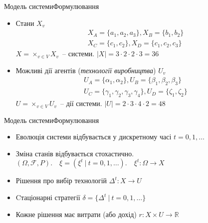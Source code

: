 \documentclass[pdf]{beamer}
\begin{document}
\begin{frame}{Модель системи}{Формулювання}
	\begin{itemize}[<+->]
	\item Стани \(X_v\)
	\begin{gather*}
		X_A = \{a_1, a_2, a_3\}, X_B = \{b_1, b_2\} \\ 
		X_C = \{c_1, c_2\}, X_D = \{c_1, c_2, c_3\}
	\end{gather*}
	\(X = \times_{v \in V} X_v\) – системи. \(|X| = 3 \cdot 2 \cdot 2 \cdot 3 = 36 \)
	\vspace{1em}
	\item Можливі дії агентів (\textit{технології виробництва}) \(U_v\)
	\begin{gather*}
		U_A = \{\alpha_1, \alpha_2\}, U_B = \{\beta_1, \beta_2, \beta_3\} \\ 
		U_C = \{\gamma_1, \gamma_2, \gamma_3, \gamma_4\}, U_D = \{\zeta_1, \zeta_2\}
	\end{gather*}
	\(U = \times_{v \in V} U_v\) – дії системи. \(|U| = 2 \cdot 3 \cdot 4 \cdot 2 = 48\)
	\end{itemize}
\end{frame}


\begin{frame}{Модель системи}{Формулювання}
	\begin{itemize}
	\item<1-> Еволюція системи відбувається у дискретному часі \(t = 0, 1, \ldots\)
	\item<2-> Зміна станів відбувається стохастично. \\
	\((\Omega, \mathcal{F}, P).\quad \xi = (\xi^t\ |\ t = 0, 1, \ldots).\quad \xi^t : \Omega \rightarrow X\)
	\item<3-> Рішення про вибір технологій \(\Delta^t: X \rightarrow U \) \\
	\item<3-> Cтаціонарні стратегії \(\delta = \{\Delta^t\ |\ t=0, 1, \ldots\}\)
	\item<4-> Кожне рішення має витрати (або дохід) \(r: X \times U \rightarrow \mathbb{R} \)
	\end{itemize}
\end{frame}
\end{document}
